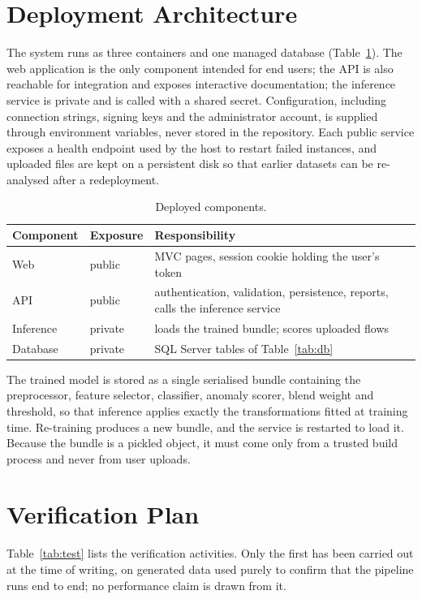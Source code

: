 \documentclass[conference]{IEEEtran}
\begin{document}
\section{Deployment Architecture}
The system runs as three containers and one managed database (Table~\ref{tab:deploy}). The web application is the only component intended for end users; the API is also reachable for integration and exposes interactive documentation; the inference service is private and is called with a shared secret. Configuration, including connection strings, signing keys and the administrator account, is supplied through environment variables, never stored in the repository. Each public service exposes a health endpoint used by the host to restart failed instances, and uploaded files are kept on a persistent disk so that earlier datasets can be re-analysed after a redeployment.

\begin{table}[!htb]
\caption{Deployed components.}
\label{tab:deploy}
\centering\footnotesize
\begin{tabular}{@{}p{1.5cm}p{1.9cm}p{3.8cm}@{}}
\hline
Component & Exposure & Responsibility \\
\hline
Web & public & MVC pages, session cookie holding the user's token \\
API & public & authentication, validation, persistence, reports, calls the inference service \\
Inference & private & loads the trained bundle; scores uploaded flows \\
Database & private & SQL Server tables of Table~\ref{tab:db} \\
\hline
\end{tabular}
\end{table}

The trained model is stored as a single serialised bundle containing the preprocessor, feature selector, classifier, anomaly scorer, blend weight and threshold, so that inference applies exactly the transformations fitted at training time. Re-training produces a new bundle, and the service is restarted to load it. Because the bundle is a pickled object, it must come only from a trusted build process and never from user uploads.

\section{Verification Plan}
Table~\ref{tab:test} lists the verification activities. Only the first has been carried out at the time of writing, on generated data used purely to confirm that the pipeline runs end to end; no performance claim is drawn from it.
\end{document}
